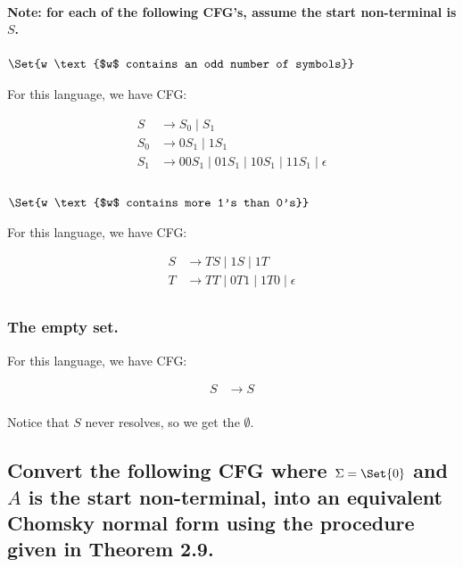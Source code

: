 \documentclass{article}
\providecommand\given{} %
\begin{document}
\paragraph{Note: for each of the following CFG's, assume the start non-terminal is $S$.}

\subsubsection{$\Set{w \given \text{$w$ contains an odd number of symbols}}$}

For this language, we have CFG:

\begin{align*}
	S &\longrightarrow S_0 \;|\; S_1 \\
	S_0 &\longrightarrow 0S_1 \;|\; 1S_1 \\
	S_1 &\longrightarrow 00S_1 \;|\; 01S_1 \;|\; 10S_1 \;|\; 11S_1 \;|\; \epsilon \\
\end{align*}

\subsubsection{$\Set{w \given \text{$w$ contains more 1's than 0's}}$}

For this language, we have CFG:

\begin{align*}
	S &\longrightarrow TS \;|\; 1S \;|\; 1T \\
	T &\longrightarrow TT \;|\; 0T1 \;|\; 1T0 \;|\; \epsilon \\
\end{align*}

\subsubsection{The empty set.}

For this language, we have CFG:

\begin{align*}
	S &\longrightarrow S \\
\end{align*}

Notice that $S$ never resolves, so we get the $\emptyset$.


\subsection{Convert the following CFG where $\Sigma = \Set{0}$ and $A$ is the start non-terminal, into an equivalent Chomsky normal form using the procedure given in Theorem 2.9.}
\end{document}

